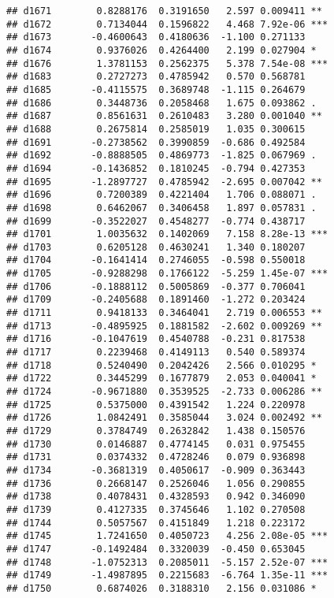 \documentclass[
]{article}
\begin{document}
\begin{verbatim}
## d1671        0.8288176  0.3191650   2.597 0.009411 ** 
## d1672        0.7134044  0.1596822   4.468 7.92e-06 ***
## d1673       -0.4600643  0.4180636  -1.100 0.271133    
## d1674        0.9376026  0.4264400   2.199 0.027904 *  
## d1676        1.3781153  0.2562375   5.378 7.54e-08 ***
## d1683        0.2727273  0.4785942   0.570 0.568781    
## d1685       -0.4115575  0.3689748  -1.115 0.264679    
## d1686        0.3448736  0.2058468   1.675 0.093862 .  
## d1687        0.8561631  0.2610483   3.280 0.001040 ** 
## d1688        0.2675814  0.2585019   1.035 0.300615    
## d1691       -0.2738562  0.3990859  -0.686 0.492584    
## d1692       -0.8888505  0.4869773  -1.825 0.067969 .  
## d1694       -0.1436852  0.1810245  -0.794 0.427353    
## d1695       -1.2897727  0.4785942  -2.695 0.007042 ** 
## d1696        0.7200389  0.4221404   1.706 0.088071 .  
## d1698        0.6462067  0.3406458   1.897 0.057831 .  
## d1699       -0.3522027  0.4548277  -0.774 0.438717    
## d1701        1.0035632  0.1402069   7.158 8.28e-13 ***
## d1703        0.6205128  0.4630241   1.340 0.180207    
## d1704       -0.1641414  0.2746055  -0.598 0.550018    
## d1705       -0.9288298  0.1766122  -5.259 1.45e-07 ***
## d1706       -0.1888112  0.5005869  -0.377 0.706041    
## d1709       -0.2405688  0.1891460  -1.272 0.203424    
## d1711        0.9418133  0.3464041   2.719 0.006553 ** 
## d1713       -0.4895925  0.1881582  -2.602 0.009269 ** 
## d1716       -0.1047619  0.4540788  -0.231 0.817538    
## d1717        0.2239468  0.4149113   0.540 0.589374    
## d1718        0.5240490  0.2042426   2.566 0.010295 *  
## d1722        0.3445299  0.1677879   2.053 0.040041 *  
## d1724       -0.9671880  0.3539525  -2.733 0.006286 ** 
## d1725        0.5375000  0.4391542   1.224 0.220978    
## d1726        1.0842491  0.3585044   3.024 0.002492 ** 
## d1729        0.3784749  0.2632842   1.438 0.150576    
## d1730        0.0146887  0.4774145   0.031 0.975455    
## d1731        0.0374332  0.4728246   0.079 0.936898    
## d1734       -0.3681319  0.4050617  -0.909 0.363443    
## d1736        0.2668147  0.2526046   1.056 0.290855    
## d1738        0.4078431  0.4328593   0.942 0.346090    
## d1739        0.4127335  0.3745646   1.102 0.270508    
## d1744        0.5057567  0.4151849   1.218 0.223172    
## d1745        1.7241650  0.4050723   4.256 2.08e-05 ***
## d1747       -0.1492484  0.3320039  -0.450 0.653045    
## d1748       -1.0752313  0.2085011  -5.157 2.52e-07 ***
## d1749       -1.4987895  0.2215683  -6.764 1.35e-11 ***
## d1750        0.6874026  0.3188310   2.156 0.031086 *  

\end{verbatim}
\end{document}

